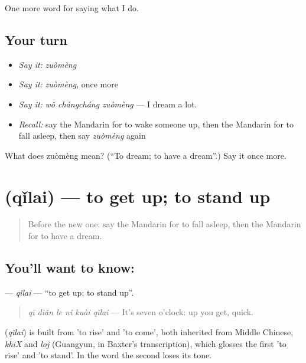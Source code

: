 \begin{grammarlens}[title={What you've built}]
One more word for saying what I do.
\end{grammarlens}

\subsection*{Your turn}
\begin{itemize}
\raggedright
  \item \emph{Say it:} \emph{zuòmèng}
  \item \emph{Say it:} \emph{zuòmèng}, once more
  \item \emph{Say it:} \emph{wǒ chángcháng zuòmèng} — I dream a lot.
  \item \emph{Recall:} say the Mandarin for to wake someone up, then the Mandarin for to fall asleep, then say \emph{zuòmèng} again
\end{itemize}

\begin{tcolorbox}[breakable,colback=teal!4,colframe=teal!35!black,title={Before you move on}]
What does zuòmèng mean? (\textquotedblleft{}To dream; to have a dream\textquotedblright{}.) Say it once more.
\end{tcolorbox}
\section[\texorpdfstring{\zh{起来} (qǐlai)}{起来 (qǐlai)}]{ (qǐlai) — to get up; to stand up}

\label{lesson:ZH-C158-qilai}



\begin{quote}
Before the new one: say the Mandarin for to fall asleep, then the Mandarin for to have a dream.
\end{quote}

\subsection*{You'll want to know: }
\textbf{} — \emph{qǐlai} — \textquotedblleft{}to get up; to stand up\textquotedblright{}.

\begin{quote}
\textbf{} \emph{qī diǎn le nǐ kuài qǐlai} — It's seven o'clock: up you get, quick.
\end{quote}

\begin{cousinweb}
\textbf{} (\emph{qǐlai}) is built from  'to rise' and  'to come', both inherited from Middle Chinese, \emph{khiX} and \emph{loj} (Guangyun, in Baxter's transcription), which glosses the first 'to rise' and 'to stand'. In the word the second loses its tone.
\end{cousinweb}

